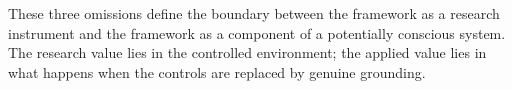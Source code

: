 These three omissions define the boundary between the framework as a research instrument and the framework as a component of a potentially conscious system. The research value lies in the controlled environment; the applied value lies in what happens when the controls are replaced by genuine grounding.
